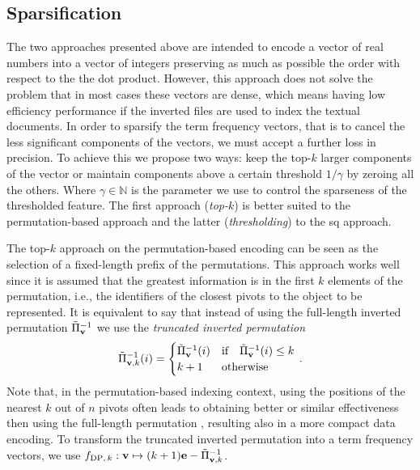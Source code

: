 \subsection{Sparsification}
The two approaches presented above are intended to encode a vector of real numbers into a vector of integers preserving as much as possible the order with respect to the the dot product.
However, this approach does not solve the problem that in most cases these vectors are dense, which means having low efficiency performance if the inverted files are used to index the textual documents.
In order to sparsify the term frequency vectors, that is to cancel the less significant components of the vectors, we must accept a further loss in precision.
To achieve this we propose two ways: keep the top-$k$ larger components of the vector or maintain components above a certain threshold $1/\gamma$ by zeroing all the others.
Where $\gamma \in \mathbb{N}$ is the parameter we use to control the sparseness of the thresholded feature.
The first approach (\emph{top-$k$}) is better suited to the permutation-based approach and the latter (\emph{thresholding}) to the \gls{sq} approach.

The top-$k$ approach on the permutation-based encoding can be seen as the selection of a fixed-length prefix of the permutations.
This approach works well since it is assumed that the greatest information is in the first $k$ elements of the permutation, i.e., the identifiers of the closest pivots to the object to be represented.
It is equivalent to say that instead of using the full-length inverted permutation $\tilde{\Pi}^{-1}_{\mathbf{v}}$  we use the \emph{truncated inverted permutation}
\begin{equation}
\tilde{\Pi}^{-1}_{\mathbf{v},k}(i) = \begin{cases}
                                \tilde{\Pi}^{-1}_{\mathbf{v}} (i) & \text{if} \quad \tilde{\Pi}^{-1}_{\mathbf{v}}(i) \leq k \\
                                k+1                       & \text{otherwise}
                             \end{cases} \,.
\end{equation}
Note that, in the permutation-based indexing context, using the positions of the {nearest} $k$ out of $n$ pivots often leads to obtaining better or similar effectiveness then using the full-length permutation \cite{amato2014mi,amato2014some}, resulting also in a more compact data encoding.
To transform the truncated inverted permutation into a term frequency vectors, we use $f_{\text{DP},\,k} : \mathbf{v} \mapsto (k+1)\mathbf{e} -\tilde{\Pi}^{-1}_{\mathbf{v},k}$.

